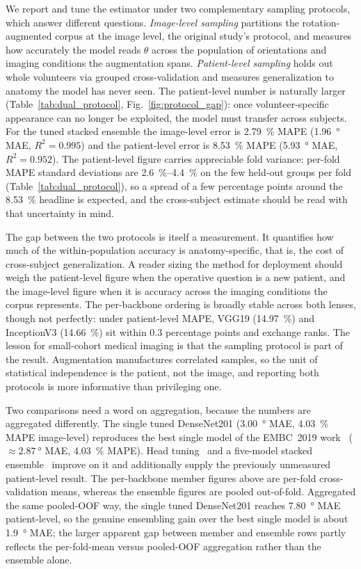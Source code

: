 We report and tune the estimator under two complementary sampling protocols, which
answer different questions. \emph{Image-level sampling} partitions the
rotation-augmented corpus at the image level, the original study's protocol, and
measures how accurately the model reads $\theta$ across the population of
orientations and imaging conditions the augmentation spans. \emph{Patient-level
sampling} holds out whole volunteers via grouped cross-validation and measures
generalization to anatomy the model has never seen. The patient-level number is
naturally larger (Table~\ref{tab:dual_protocol}, Fig.~\ref{fig:protocol_gap}): once
volunteer-specific appearance can no longer be exploited, the model must transfer
across subjects. For the tuned stacked ensemble the image-level error is
\SI{2.79}{\percent} MAPE (\SI{1.96}{\degree} MAE, $R^2=0.995$) and the
patient-level error is \SI{8.53}{\percent} MAPE (\SI{5.93}{\degree} MAE,
$R^2=0.952$). The patient-level figure carries appreciable fold variance: per-fold
MAPE standard deviations are \SIrange{2.6}{4.4}{\percent} on the few held-out groups
per fold (Table~\ref{tab:dual_protocol}), so a spread of a few percentage points
around the \SI{8.53}{\percent} headline is expected, and the cross-subject estimate
should be read with that uncertainty in mind.

The gap between the two protocols is itself a measurement. It quantifies how much of
the within-population accuracy is anatomy-specific, that is, the cost of
cross-subject generalization. A reader sizing the method for deployment should weigh
the patient-level figure when the operative question is a new patient, and the
image-level figure when it is accuracy across the imaging conditions the corpus
represents. The per-backbone ordering is broadly stable across both lenses, though
not perfectly: under patient-level MAPE, VGG19 (\SI{14.97}{\percent}) and
InceptionV3 (\SI{14.66}{\percent}) sit within \SI{0.3}{} percentage points and
exchange ranks. The lesson for small-cohort medical imaging is that the sampling
protocol is part of the result. Augmentation manufactures correlated samples, so the
unit of statistical independence is the patient, not the image, and reporting both
protocols is more informative than privileging one.

Two comparisons need a word on aggregation, because the numbers are aggregated
differently. The single tuned DenseNet201 (\SI{3.00}{\degree} MAE,
\SI{4.03}{\percent} MAPE image-level) reproduces the best single model of the
EMBC~2019 work~\citep{Patil2019} ($\approx\SI{2.87}{\degree}$ MAE,
\SI{4.03}{\percent} MAPE). Head tuning~\citep{Akiba2019,Bergstra2011} and a
five-model stacked ensemble~\citep{Wolpert1992} improve on it and additionally
supply the previously unmeasured patient-level result. The per-backbone member
figures above are per-fold cross-validation means, whereas the ensemble figures are
pooled out-of-fold. Aggregated the same pooled-OOF way, the single tuned
DenseNet201 reaches \SI{7.80}{\degree} MAE patient-level, so the genuine ensembling
gain over the best single model is about \SI{1.9}{\degree} MAE; the larger apparent
gap between member and ensemble rows partly reflects the per-fold-mean versus
pooled-OOF aggregation rather than the ensemble alone.


